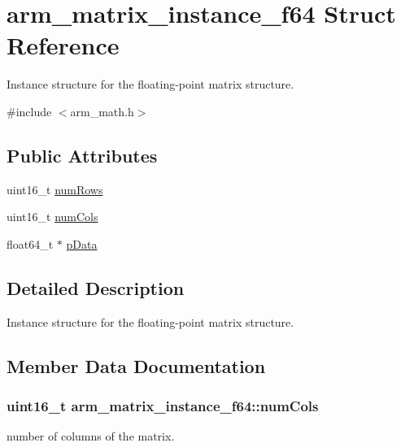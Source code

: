 \hypertarget{structarm__matrix__instance__f64}{}\section{arm\+\_\+matrix\+\_\+instance\+\_\+f64 Struct Reference}
\label{structarm__matrix__instance__f64}


Instance structure for the floating-\/point matrix structure.  




{\ttfamily \#include $<$arm\+\_\+math.\+h$>$}

\subsection*{Public Attributes}
\begin{DoxyCompactItemize}
\item 
uint16\+\_\+t \hyperlink{structarm__matrix__instance__f64_a8b44d1e5003345047c4ead9e1593bf22}{num\+Rows}
\item 
uint16\+\_\+t \hyperlink{structarm__matrix__instance__f64_ab0f0399aff3201880e2d8a447de9a7ee}{num\+Cols}
\item 
float64\+\_\+t $\ast$ \hyperlink{structarm__matrix__instance__f64_a5b2475f8ff1e4818955cdd18bc40a097}{p\+Data}
\end{DoxyCompactItemize}


\subsection{Detailed Description}
Instance structure for the floating-\/point matrix structure. 

\subsection{Member Data Documentation}
\subsubsection[{\texorpdfstring{num\+Cols}{numCols}}]{\setlength{\rightskip}{0pt plus 5cm}uint16\+\_\+t arm\+\_\+matrix\+\_\+instance\+\_\+f64\+::num\+Cols}\hypertarget{structarm__matrix__instance__f64_ab0f0399aff3201880e2d8a447de9a7ee}{}\label{structarm__matrix__instance__f64_ab0f0399aff3201880e2d8a447de9a7ee}
number of columns of the matrix. 
